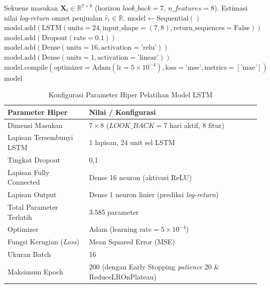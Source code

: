 \documentclass[10pt,a4paper]{article}
\begin{document}
\begin{algorithm}[htbp]
\caption{Konstruksi Model LSTM Hybrid Residual Berbasis TensorFlow/Keras}
\label{alg:lstm_model}
\fontsize{8.5pt}{10.5pt}\selectfont
\begin{algorithmic}[1]
\Require Sekuens masukan $\mathbf{X}_t \in \mathbb{R}^{7 \times 8}$ (horizon $look\_back = 7$, $n\_features = 8$).
\Ensure Estimasi nilai \textit{log-return} omzet penjualan $\hat{r}_t \in \mathbb{R}$.
\State $\text{model} \gets \text{Sequential}()$
\State $\text{model}.\text{add}(\text{LSTM}(\text{units}=24, \text{input\_shape}=(7, 8), \text{return\_sequences}=\text{False}))$
\State $\text{model}.\text{add}(\text{Dropout}(\text{rate}=0.1))$
\State $\text{model}.\text{add}(\text{Dense}(\text{units}=16, \text{activation}=\text{'relu'}))$
\State $\text{model}.\text{add}(\text{Dense}(\text{units}=1, \text{activation}=\text{'linear'}))$
\State $\text{model}.\text{compile}(\text{optimizer}=\text{Adam}(\text{lr}=5 \times 10^{-4}), \text{loss}=\text{'mse'}, \text{metrics}=[\text{'mae'}])$
\State \Return $\text{model}$
\end{algorithmic}
\end{algorithm}

\begin{table}[htbp]
  \centering
  \caption{Konfigurasi Parameter Hiper Pelatihan Model LSTM}
  \label{tab:param_pelatihan}
  \fontsize{8.5pt}{11pt}\selectfont
  \begin{tabular}{ll}
    \toprule
    \textbf{Parameter Hiper} & \textbf{Nilai / Konfigurasi} \\
    \midrule
    Dimensi Masukan & $7 \times 8$ ($LOOK\_BACK = 7$ hari aktif, 8 fitur) \\
    Lapisan Tersembunyi LSTM & 1 lapisan, 24 unit sel LSTM \\
    Tingkat Dropout & 0,1 \\
    Lapisan Fully Connected & Dense 16 neuron (aktivasi ReLU) \\
    Lapisan Output & Dense 1 neuron linier (prediksi \textit{log-return}) \\
    Total Parameter Terlatih & 3.585 parameter \\
    Optimizer & Adam ($\text{learning rate} = 5 \times 10^{-4}$) \\
    Fungsi Kerugian (\textit{Loss}) & Mean Squared Error (MSE) \\
    Ukuran Batch & 16 \\
    Maksimum Epoch & 200 (dengan Early Stopping \textit{patience} 20 \& ReduceLROnPlateau) \\
    \bottomrule
  \end{tabular}
\end{table}
\end{document}
